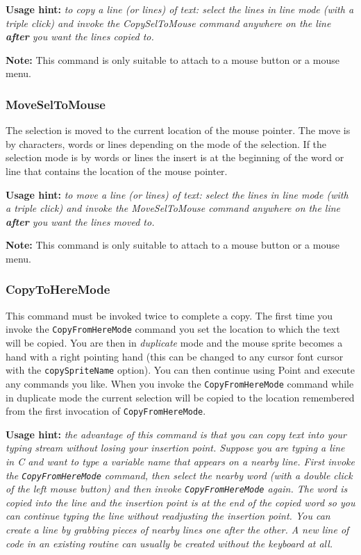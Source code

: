 {\bf Usage hint:} {\it to copy a line (or lines) of text:
select the lines in line mode (with a triple click)
and invoke the CopySelToMouse command anywhere on the line {\bf after}
you want the lines copied to.}

{\bf Note:} This command is only suitable to attach to a mouse
button or a mouse menu.

\subsubsection{MoveSelToMouse}
The selection is moved to the current location of the mouse pointer.
The move is by characters, words or lines depending on the mode
of the selection.
If the selection mode is by words or lines the insert is at the
beginning of the word or line that contains the location
of the mouse pointer.

{\bf Usage hint:} {\it to move a line (or lines) of text:
select the lines in line mode (with a triple click)
and invoke the MoveSelToMouse command anywhere on the line {\bf after}
you want the lines moved to.}

{\bf Note:} This command is only suitable to attach to a mouse
button or a mouse menu.

\subsubsection{CopyToHereMode}
This command must be invoked twice to complete a copy.
The first time you invoke the {\tt CopyFromHereMode} command you set the
location to which the text will be copied.
You are then in {\em duplicate} mode and the mouse sprite becomes
a hand with a right pointing hand (this can be changed
to any cursor font cursor with the {\tt copySpriteName} option).
You can then continue using Point and execute any commands you like.
When you invoke the {\tt CopyFromHereMode} command while in duplicate mode
the current selection will be copied to the location remembered
from the first invocation of {\tt CopyFromHereMode}.

{\bf Usage hint:} {\it the advantage of this command is that you can copy
text into your typing stream without losing your insertion point.
Suppose you are typing a line in C and want to type a variable
name that appears on a nearby line.
First invoke the {\tt CopyFromHereMode} command, then select the nearby word
(with a double click of the left mouse button) and then invoke
{\tt CopyFromHereMode} again.
The word is copied into the line and the insertion point is at the
end of the copied word so you can continue typing the line without
readjusting the insertion point.
You can create a line by grabbing pieces of nearby lines one after
the other.
A new line of code in an existing routine can usually be created without
the keyboard at all.}

